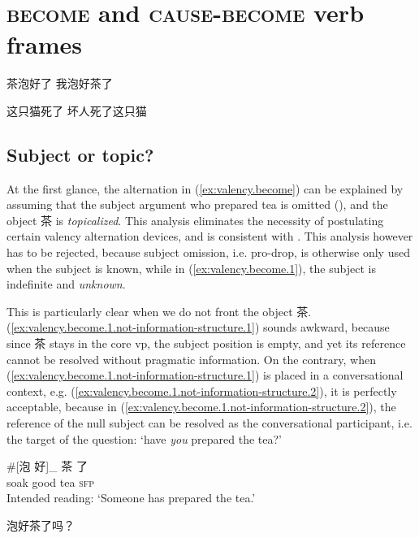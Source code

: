 \documentclass[UTF8, a4paper, oneside, scheme=plain, 12pt]{ctexrep}
\newcommand{\translate}[1]{`#1'}
\newcommand*{\category}[1]{\textsc{#1}}
\begin{document}
\section{\category{become} and \category{cause}-\category{become} verb frames}

\begin{exe}
    \ex\label{ex:valency.become} \begin{xlist}
        \ex\label{ex:valency.become.1} 茶泡好了
        \ex 我泡好茶了
    \end{xlist}

    \ex\label{ex:valency.become-only}
    \begin{xlist}
        \ex\label{ex:valency.become-only.1} 这只猫死了
        \ex *坏人死了这只猫
    \end{xlist}
\end{exe}

\subsection{Subject or topic?}\label{sec:valency.become.subject-or-topic}

At the first glance, the alternation in (\ref{ex:valency.become})
can be explained by assuming that the 
subject argument who prepared tea is omitted (),
and the object 茶 is \emph{topicalized}.
This analysis eliminates the necessity of postulating certain valency alternation devices,
and is consistent with \citet{lapolla20091}.
This analysis however has to be rejected,
because subject omission, i.e. pro-drop,
is otherwise only used when the subject is known,
while in (\ref{ex:valency.become.1}),
the subject is indefinite and \emph{unknown}.

This is particularly clear when we do not front the object 茶.
(\ref{ex:valency.become.1.not-information-structure.1}) sounds awkward,
because since 茶 stays in the core \ac{vp},
the subject position is empty, and yet its reference cannot be resolved
without pragmatic information.
On the contrary, when (\ref{ex:valency.become.1.not-information-structure.1})
is placed in a conversational context,
e.g. (\ref{ex:valency.become.1.not-information-structure.2}),
it is perfectly acceptable, because in (\ref{ex:valency.become.1.not-information-structure.2}),
the reference of the null subject can be resolved as the conversational participant,
i.e. the target of the question:
\translate{have \emph{you} prepared the tea?}

\begin{exe}
    \ex \begin{xlist}
        \ex\label{ex:valency.become.1.not-information-structure.1}
        \gll \#[泡 好]_{} 茶 了 \\
        soak good tea \category{sfp} \\
        \glt Intended reading: \translate{Someone has prepared the tea.}
    
        \ex\label{ex:valency.become.1.not-information-structure.2} 泡好茶了吗？
    \end{xlist}
\end{exe}
\end{document}
